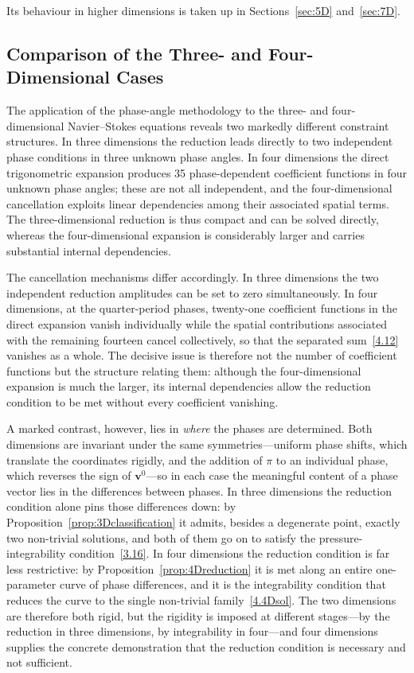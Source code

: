 \documentclass[11pt]{jfm}
\numberwithin{equation}{section}
\begin{document}
Its behaviour in higher dimensions is taken up in Sections~\ref{sec:5D} and~\ref{sec:7D}.

\subsection{Comparison of the Three- and Four-Dimensional Cases}
The application of the phase-angle methodology to the three- and four-dimensional Navier--Stokes
equations reveals two markedly different constraint structures. In three dimensions the reduction
leads directly to two independent phase conditions in three unknown phase angles. In four
dimensions the direct trigonometric expansion produces 35 phase-dependent coefficient functions in
four unknown phase angles; these are not all independent, and the four-dimensional cancellation
exploits linear dependencies among their associated spatial terms. The three-dimensional reduction
is thus compact and can be solved directly, whereas the four-dimensional expansion is considerably
larger and carries substantial internal dependencies.

The cancellation mechanisms differ accordingly. In three dimensions the two independent reduction
amplitudes can be set to zero simultaneously. In four dimensions, at the quarter-period phases,
twenty-one coefficient functions in the direct expansion vanish individually while the spatial
contributions associated with the remaining fourteen cancel collectively, so that the separated
sum~\eqref{4.12} vanishes as a whole. The decisive issue is therefore not the number of coefficient
functions but the structure relating them: although the four-dimensional expansion is much the
larger, its internal dependencies allow the reduction condition to be met without every
coefficient vanishing.

A marked contrast, however, lies in \emph{where} the phases are determined. Both dimensions are
invariant under the same symmetries---uniform phase shifts, which translate the coordinates
rigidly, and the addition of $\pi$ to an individual phase, which reverses the sign of
$\boldsymbol{v}^0$---so in each case the meaningful content of a phase vector lies in the
differences between phases. In three dimensions the reduction condition alone pins those
differences down: by Proposition~\ref{prop:3Dclassification} it admits, besides a degenerate
point, exactly two non-trivial solutions, and both of them go on to satisfy the
pressure-integrability condition~\eqref{3.16}. In four dimensions the reduction condition is far
less restrictive: by Proposition~\ref{prop:4Dreduction} it is met along an entire one-parameter
curve of phase differences, and it is the integrability condition that reduces the curve to the
single non-trivial family~\eqref{4.4Dsol}. The two dimensions are therefore both rigid, but the
rigidity is imposed at different stages---by the reduction in three dimensions, by integrability in
four---and four dimensions supplies the concrete demonstration that the reduction condition is
necessary and not sufficient.
\end{document}
